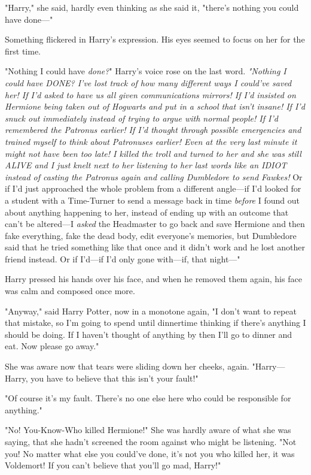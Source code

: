 "Harry," she said, hardly even thinking as she said it, "there's nothing you could have done---"

Something flickered in Harry's expression. His eyes seemed to focus on her for the first time.

"Nothing I could have \emph{done?}" Harry's voice rose on the last word. \emph{"Nothing I could have DONE? I've lost track of how many different ways I could've saved her! If I'd asked to have us all given communications mirrors! If I'd insisted on Hermione being taken out of Hogwarts and put in a school that isn't insane! If I'd snuck out immediately instead of trying to argue with normal people! If I'd remembered the Patronus earlier! If I'd thought through possible emergencies and trained myself to think about Patronuses earlier! Even at the very last minute it might not have been too late! I killed the troll and turned to her and she was still ALIVE and I just knelt next to her listening to her last words like an IDIOT instead of casting the Patronus again and calling Dumbledore to send Fawkes!} Or if I'd just approached the whole problem from a different angle---if I'd looked for a student with a Time-Turner to send a message back in time \emph{before} I found out about anything happening to her, instead of ending up with an outcome that can't be altered---I \emph{asked} the Headmaster to go back and save Hermione and then fake everything, fake the dead body, edit everyone's memories, but Dumbledore said that he tried something like that once and it didn't work and he lost another friend instead. Or if I'd---if I'd only gone with---if, that night---"

Harry pressed his hands over his face, and when he removed them again, his face was calm and composed once more.

"Anyway," said Harry Potter, now in a monotone again, "I don't want to repeat that mistake, so I'm going to spend until dinnertime thinking if there's anything I should be doing. If I haven't thought of anything by then I'll go to dinner and eat. Now please go away."

She was aware now that tears were sliding down her cheeks, again. "Harry---Harry, you have to believe that this isn't your fault!"

"Of course it's my fault. There's no one else here who could be responsible for anything."

"No! You-Know-Who killed Hermione!" She was hardly aware of what she was saying, that she hadn't screened the room against who might be listening. "Not you! No matter what else you could've done, it's not you who killed her, it was Voldemort! If you can't believe that you'll go mad, Harry!"

